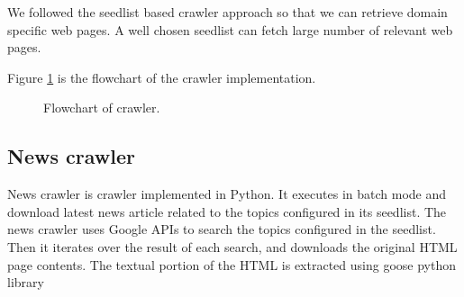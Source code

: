     We followed the seedlist based crawler approach so that we can retrieve
    domain specific web pages. A well chosen seedlist can fetch large number
    of relevant web pages.

 Figure \ref{fig:crawleralgo} is the flowchart of the crawler implementation.
\begin{figure}[htbp]
\centering
{}
\caption{Flowchart of crawler.}
\label{fig:crawleralgo}
\end{figure}

\subsection{News crawler} \label{newscrawlersection}
News crawler is crawler implemented in Python. It executes in
 batch mode and download latest news article related to the topics configured
 in its seedlist. The news crawler uses Google APIs
 \cite{www-google-custom-search} to search  the topics configured in the
 seedlist. Then it iterates over the result of each search, and downloads the
  original HTML page contents. The textual portion of the HTML is extracted
  using goose python library \cite{www-goose}


